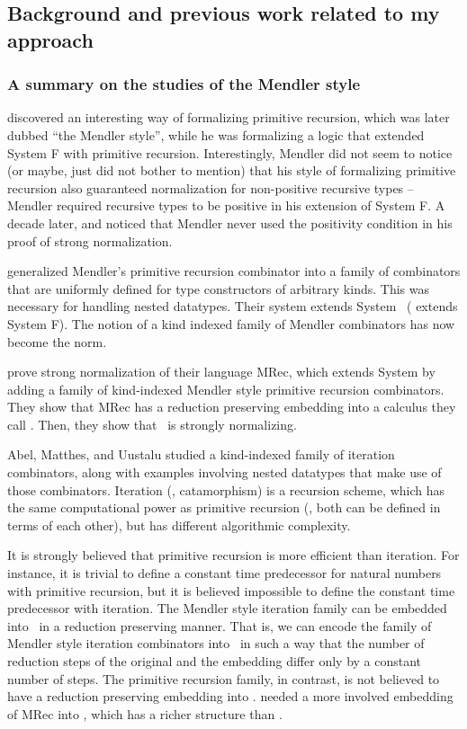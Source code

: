 \subsection{Background and previous work related to my approach}
\label{sec:relwork:bg}
\subsubsection{A summary on the studies of the Mendler style}
\citet{Mendler87} discovered an interesting way of formalizing
primitive recursion, which was later dubbed ``the Mendler style'',
while he was formalizing a logic that extended System \textsf{F} with
primitive recursion. Interestingly, Mendler did not seem to notice
(or maybe, just did not bother to mention) that his style of formalizing
primitive recursion also guaranteed normalization for non-positive recursive
types -- Mendler required recursive types to be positive in his extension of
System \textsf{F}. A decade later, \citet{matthes98phd} and \citet{uustalu98phd}
noticed that Mendler never used the positivity condition in his proof of
strong normalization.

\citet{AbeMat04} generalized Mendler's primitive recursion combinator
\cite{Mendler87} into a family of combinators that are uniformly defined for
type constructors of arbitrary kinds. This was necessary for
handling nested datatypes. Their system extends System \Fw\ 
(\citet{Mendler87} extends System \textsf{F}). The notion
of a kind indexed family of Mendler combinators has now become the norm.

\citet{AbeMat04} prove strong normalization of their language \textsf{MRec},
which extends System \Fw by adding a family of kind-indexed Mendler style
primitive recursion combinators. They show that \textsf{MRec} has
a reduction preserving embedding into a calculus they call \Fixw.
Then, they show that \Fixw\ is strongly normalizing.

Abel, Matthes, and Uustalu \cite{AbeMatUus03,AbeMatUus05} studied
a kind-indexed family of iteration combinators, along with examples
involving nested datatypes that make use of those combinators.
Iteration (\aka, catamorphism) is a recursion scheme, which has the same
computational power as primitive recursion (\ie, both can be defined
in terms of each other), but has different algorithmic complexity. 

It is strongly believed that primitive recursion is more efficient than
iteration. For instance, it is trivial to define a constant time predecessor
for natural numbers with primitive recursion, but it is believed impossible
to define the constant time predecessor with iteration. The Mendler style
iteration family can be embedded into \Fw\ in a reduction preserving manner.
That is, we can encode the family of Mendler style iteration combinators
into \Fw\ in such a way that the number of reduction steps of the original
and the embedding differ only by a constant number of steps. The primitive
recursion family, in contrast, is not believed to have a reduction preserving
embedding into \Fw. \citet{AbeMat04} needed a more involved embedding of
\textsf{MRec} into \Fixw, which has a richer structure than \Fw.


